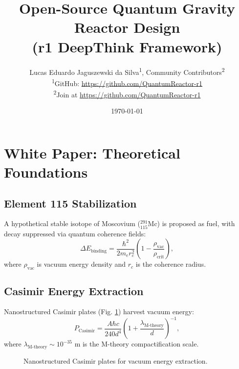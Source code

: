 \documentclass[12pt, a4paper]{article}
\title{Open-Source Quantum Gravity Reactor Design \\ (r1 DeepThink Framework)}
\author{
  Lucas Eduardo Jaguszewski da Silva\textsuperscript{1}, 
  Community Contributors\textsuperscript{2} \\
  \textsuperscript{1}GitHub: \url{https://github.com/QuantumReactor-r1} \\
  \textsuperscript{2}Join at \url{https://github.com/QuantumReactor-r1}
}
\date{\today}
\begin{document}
\maketitle

\section*{White Paper: Theoretical Foundations}
\subsection*{Element 115 Stabilization}
A hypothetical stable isotope of Moscovium (\(^{291}_{115}\text{Mc}\)) is proposed as fuel, with decay suppressed via quantum coherence fields:
\begin{equation}
\Delta E_{\text{binding}} = \frac{\hbar^2}{2m_e r_c^2} \left(1 - \frac{\rho_{\text{vac}}}{\rho_{\text{crit}}}\right), \label{eq:element115}
\end{equation}
where \(\rho_{\text{vac}}\) is vacuum energy density and \(r_c\) is the coherence radius.

\subsection*{Casimir Energy Extraction}
Nanostructured Casimir plates (Fig. \ref{fig:casimir}) harvest vacuum energy:
\begin{equation}
P_{\text{Casimir}} = \frac{A \hbar c}{240 d^4} \left(1 + \frac{\lambda_{\text{M-theory}}}{d}\right)^{-1}, \label{eq:casimir}
\end{equation}
where \(\lambda_{\text{M-theory}} \sim 10^{-35}\) m is the M-theory compactification scale.

\begin{figure}[h]
\centering
{}
\caption{Nanostructured Casimir plates for vacuum energy extraction.}
\label{fig:casimir}
\end{figure}

\end{document}
